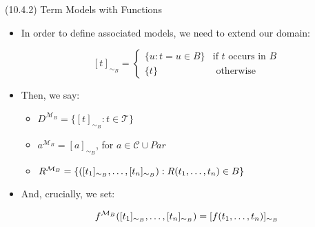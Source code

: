 \begin{frame}{(10.4.2) Term Models with Functions}

	\begin{itemize}
	
		\item In order to define associated models, we need to extend our domain:
		
		 \[[t]_{\sim_B}=\begin{cases} \{u:t=u\in B\} &\text{if }t\text{ occurs in }B\\
	\{t\} &\text{ otherwise}\end{cases}\]
	
		\item Then, we say:
		\begin{itemize}
		
			\item $D^{\mathcal{M}_B}=\{[t]_{\sim_B}:t\in\mathcal{T}\}$
			
			\item $a^{\mathcal{M}_B}=[a]_{\sim_B}$, for $a\in \mathcal{C}\cup Par$
			
			\item $R^{\mathcal{M}_B}=\{([t_1]_{\sim_B}, \mathellipsis, [t_n]_{\sim_B}): R(t_1, \mathellipsis, t_n)\in B\}$

		\end{itemize}
		
		\item And, crucially, we set:
		
		\[f^{\mathcal{M}_B}([t_1]_{\sim_B},\mathellipsis, [t_n]_{\sim_B})=[f(t_1, \mathellipsis, t_n)]_{\sim_B}\]
		
	\end{itemize}

\end{frame}

